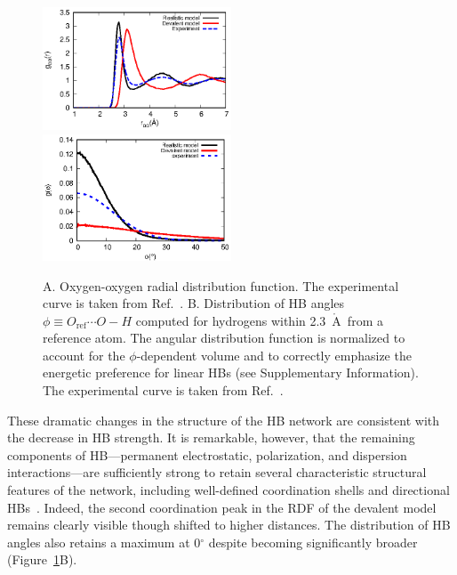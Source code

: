 \documentclass[journal=jacsat,manuscript=article]{achemso}
\newcommand{\Ang}{\ensuremath{\mathring{\text{A}}}}
\begin{document}
\begin{figure}
\includegraphics[width=0.5\textwidth]{new_rdf}
\includegraphics[width=0.5\textwidth]{new_adf}
\caption{A. Oxygen-oxygen radial distribution function. The experimental curve is taken from Ref.~. B. Distribution of HB angles $\phi \equiv O_{\text{ref}} \cdots O-H$ computed for hydrogens within 2.3~\Ang\ from a reference atom. The angular distribution function is normalized to account for the $\phi$-dependent volume and to correctly emphasize the energetic preference for linear HBs (see Supplementary Information). The experimental curve is taken from Ref.~.} \label{Fig:RDF}
\end{figure}

These dramatic changes in the structure of the HB network are consistent with the decrease in HB strength. 
It is remarkable, however, that the remaining components of HB---permanent electrostatic, polarization, and dispersion interactions---are sufficiently strong to retain several characteristic structural features of the network, including well-defined coordination shells and directional HBs~\cite{arunan2011definition}.
Indeed, the second coordination peak in the RDF of the devalent model remains clearly visible though shifted to higher distances. 
The distribution of HB angles also retains a maximum at 0$^\circ$ despite becoming significantly broader (Figure~\ref{Fig:RDF}B).
\end{document}
